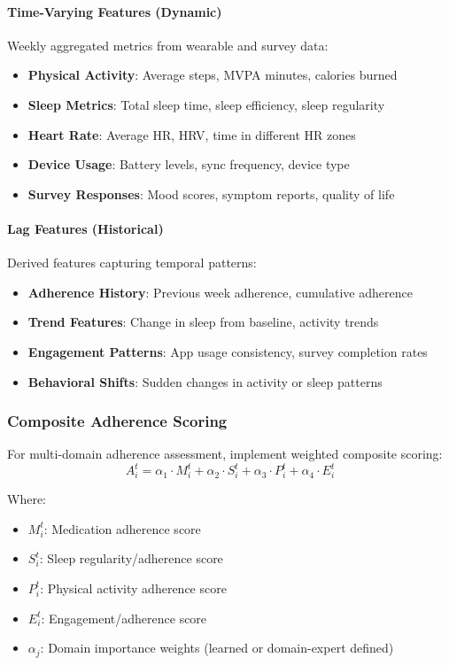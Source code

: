 \documentclass[12pt]{article}
\begin{document}
\paragraph{Time-Varying Features (Dynamic)}
Weekly aggregated metrics from wearable and survey data:
\begin{itemize}
    \item \textbf{Physical Activity}: Average steps, MVPA minutes, calories burned
    \item \textbf{Sleep Metrics}: Total sleep time, sleep efficiency, sleep regularity
    \item \textbf{Heart Rate}: Average HR, HRV, time in different HR zones
    \item \textbf{Device Usage}: Battery levels, sync frequency, device type
    \item \textbf{Survey Responses}: Mood scores, symptom reports, quality of life
\end{itemize}

\paragraph{Lag Features (Historical)}
Derived features capturing temporal patterns:
\begin{itemize}
    \item \textbf{Adherence History}: Previous week adherence, cumulative adherence
    \item \textbf{Trend Features}: Change in sleep from baseline, activity trends
    \item \textbf{Engagement Patterns}: App usage consistency, survey completion rates
    \item \textbf{Behavioral Shifts}: Sudden changes in activity or sleep patterns
\end{itemize}

\subsubsection{Composite Adherence Scoring}

For multi-domain adherence assessment, implement weighted composite scoring:
\begin{equation}
A_i^t = \alpha_1 \cdot M_i^t + \alpha_2 \cdot S_i^t + \alpha_3 \cdot P_i^t + \alpha_4 \cdot E_i^t
\end{equation}

Where:
\begin{itemize}
    \item $M_i^t$: Medication adherence score
    \item $S_i^t$: Sleep regularity/adherence score
    \item $P_i^t$: Physical activity adherence score
    \item $E_i^t$: Engagement/adherence score
    \item $\alpha_j$: Domain importance weights (learned or domain-expert defined)
\end{itemize}
\end{document}
